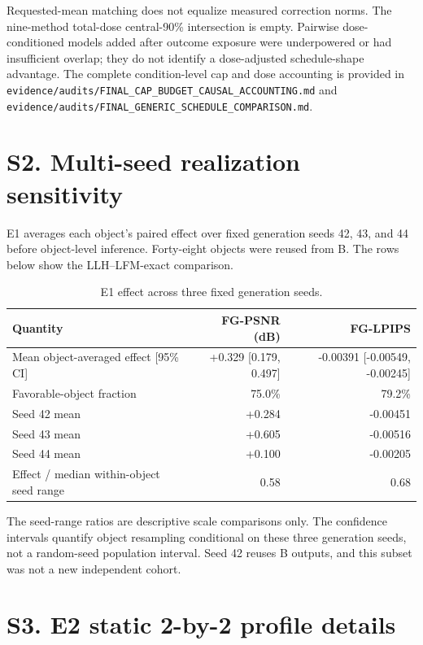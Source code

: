 \documentclass[10pt]{article}
\begin{document}
Requested-mean matching does not equalize measured correction norms. The nine-method total-dose central-90\% intersection is empty. Pairwise dose-conditioned models added after outcome exposure were underpowered or had insufficient overlap; they do not identify a dose-adjusted schedule-shape advantage. The complete condition-level cap and dose accounting is provided in \texttt{evidence/audits/FINAL\_CAP\_BUDGET\_CAUSAL\_ACCOUNTING.md} and \texttt{evidence/audits/FINAL\_GENERIC\_SCHEDULE\_COMPARISON.md}.

\section{S2. Multi-seed realization sensitivity}

E1 averages each object's paired effect over fixed generation seeds 42, 43, and 44 before object-level inference. Forty-eight objects were reused from B. The rows below show the LLH--LFM-exact comparison.

\begin{table}[h]
\centering\small
\caption{E1 effect across three fixed generation seeds.}
\begin{tabular}{lrr}
\toprule
Quantity & FG-PSNR (dB) & FG-LPIPS \\
\midrule
Mean object-averaged effect [95\% CI] & +0.329 [0.179, 0.497] & -0.00391 [-0.00549, -0.00245] \\
Favorable-object fraction & 75.0\% & 79.2\% \\
Seed 42 mean & +0.284 & -0.00451 \\
Seed 43 mean & +0.605 & -0.00516 \\
Seed 44 mean & +0.100 & -0.00205 \\
Effect / median within-object seed range & 0.58 & 0.68 \\
\bottomrule
\end{tabular}
\end{table}

The seed-range ratios are descriptive scale comparisons only. The confidence intervals quantify object resampling conditional on these three generation seeds, not a random-seed population interval. Seed 42 reuses B outputs, and this subset was not a new independent cohort.

\section{S3. E2 static 2-by-2 profile details}
\end{document}
